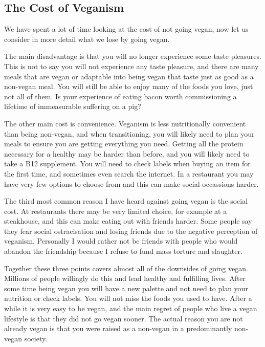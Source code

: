 \subsection{The Cost of Veganism}
\label{sec:TheCostOfVeganism}

We have spent a lot of time looking at the cost of not going vegan, now let us consider in more detail what we lose by going vegan.

The main disadvantage is that you will no longer experience some taste pleasures. This is not to say you will not experience any taste pleasure, and there are many meals that are vegan or adaptable into being vegan that taste just as good as a non-vegan meal. You will still be able to enjoy many of the foods you love, just not all of them. Is your experience of eating bacon worth commissioning a lifetime of immeasurable suffering on a pig?

The other main cost is convenience. Veganism is less nutritionally convenient than being non-vegan, and when transitioning, you will likely need to plan your meals to ensure you are getting everything you need. Getting all the protein necessary for a healthy may be harder than before, and you will likely need to take a B12 supplement. You will need to check labels when buying an item for the first time, and sometimes even search the internet. In a restaurant you may have very few options to choose from and this can make social occassions harder.

The third most common reason I have heard against going vegan is the social cost. At restaurants there may be very limited choice, for example at a steakhouse, and this can make eating out with friends harder. Some people say they fear social ostracisation and losing friends due to the negative perception of veganism. Personally I would rather not be friends with people who would abandon the friendship because I refuse to fund mass torture and slaughter.

Together these three points covers almost all of the downsides of going vegan. Millions of people willingly do this and lead healthy and fulfilling lives. After some time being vegan you will have a new palette and not need to plan your nutrition or check labels. You will not miss the foods you used to have. After a while it is very easy to be vegan, and the main regret of people who live a vegan lifestyle is that they did not go vegan sooner. The actual reason you are not already vegan is that you were raised as a non-vegan in a predominantly non-vegan society.

